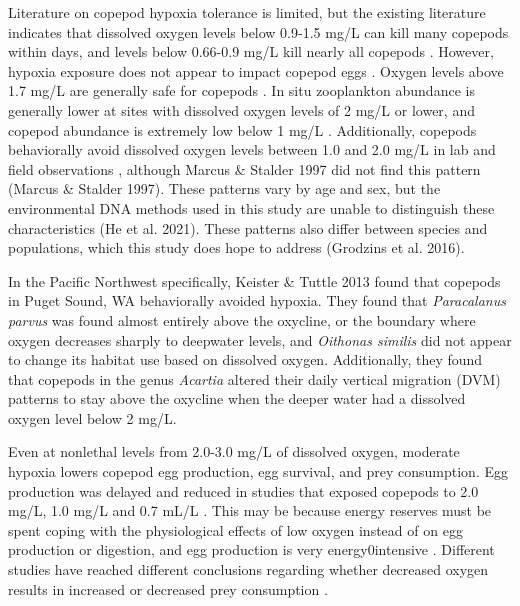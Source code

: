 \documentclass[12pt,twoside]{reedthesis}
\begin{document}
Literature on copepod hypoxia tolerance is limited, but the existing literature indicates that dissolved oxygen levels below 0.9-1.5 mg/L can kill many copepods within days, and levels below 0.66-0.9 mg/L kill nearly all copepods \autocite{He2021, Marcus2004, Stalder1997, Grodzins2016}. However, hypoxia exposure does not appear to impact copepod eggs \autocite{Invidia2004}. Oxygen levels above 1.7 mg/L are generally safe for copepods \autocite{Grodzins2016}. In situ zooplankton abundance is generally lower at sites with dissolved oxygen levels of 2 mg/L or lower, and copepod abundance is extremely low below 1 mg/L \autocite{Keister2020, Roman1993}. Additionally, copepods behaviorally avoid dissolved oxygen levels between 1.0 and 2.0 mg/L in lab and field observations \autocite{Keister2020, Roman1993, He2021, Elliott2012, Keister2013}, although Marcus \& Stalder 1997 did not find this pattern (Marcus \& Stalder 1997). These patterns vary by age and sex, but the environmental DNA methods used in this study are unable to distinguish these characteristics (He et al. 2021). These patterns also differ between species and populations, which this study does hope to address (Grodzins et al. 2016). 

In the Pacific Northwest specifically, Keister \& Tuttle 2013 found that copepods in Puget Sound, WA behaviorally avoided hypoxia. They found that \textit{Paracalanus parvus} was found almost entirely above the oxycline, or the boundary where oxygen decreases sharply to deepwater levels, and \textit{Oithonas similis} did not appear to change its habitat use based on dissolved oxygen. Additionally, they found that copepods in the genus \textit{Acartia} altered their daily vertical migration (DVM) patterns to stay above the oxycline when the deeper water had a dissolved oxygen level below 2 mg/L.

Even at nonlethal levels from 2.0-3.0 mg/L of dissolved oxygen, moderate hypoxia lowers copepod egg production, egg survival, and prey consumption. Egg production was delayed and reduced in studies that exposed copepods to 2.0 mg/L, 1.0 mg/L and 0.7 mL/L \autocite{Marcus2004, Richmond2006, Roman1993}. This may be because energy reserves must be spent coping with the physiological effects of low oxygen instead of on egg production or digestion, and egg production is very energy0intensive \autocite{Marcus2004, Elliott2013, Lutz1992, Stalder1997, Roff1992}.  Different studies have reached different conclusions regarding whether decreased oxygen results in increased or decreased prey consumption \autocite{He2021, Elliott2013}. 
\end{document}
